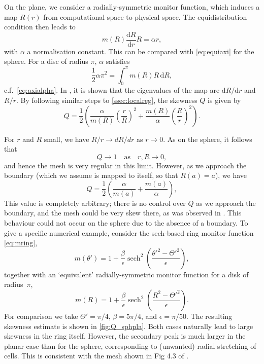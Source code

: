 \documentclass[11pt, a4paper]{scrartcl}  %
\theoremstyle{plain}
\theoremstyle{definition}
\numberwithin{equation}{section}
\DeclareMathOperator{\sech}{sech}
\newcommand{\dd}[2]{\frac{\mathrm{d} #1}{\mathrm{d} #2}}
\begin{document}
On the plane, we consider a radially-symmetric
monitor function, which induces a map $R(r)$ from computational space to
physical space. The equidistribution condition then leads to
\begin{equation}
\label{eq:equirad}
m(R) \dd{R}{r} R = \alpha r,
\end{equation}
with $\alpha$ a normalisation constant. This can be compared
with \cref{eq:equiaxi} for the sphere. For a disc of radius $\pi$,
$\alpha$ satisfies
\begin{equation}
\label{eq:radalpha}
\frac{1}{2} \alpha \pi^2 = \int_0^\pi m(R) R \,\mathrm{d}R,
\end{equation}
c.f.\ \cref{eq:axialpha}. In \citet{budd2015geometry}, it is shown that
the eigenvalues of the map are $\mathrm{d}R/\mathrm{d}r$ and $R/r$. By
following similar steps to \cref{ssec:localreg}, the skewness $Q$ is
given by
\begin{equation}
\label{eq:Qrad}
Q = \frac{1}{2} \left( \frac{\alpha}{m(R)} \left( \frac{r}{R} \right)^2 + \frac{m(R)}{\alpha} \left( \frac{R}{r} \right)^2 \right).
\end{equation}

For $r$ and $R$ small, we have $R/r \to dR/dr$ as $r \to 0$. As on the
sphere, it follows that
\begin{equation}
Q \to 1 \quad \mbox{as} \quad r, R \to 0,
\end{equation}
and hence the mesh is very regular in this limit. However, as we
approach the boundary (which we assume is mapped to itself, so that
$R(a) = a$), we have
\begin{equation}
Q = \frac{1}{2} \left( \frac{\alpha}{m(a)} + \frac{m(a)}{\alpha} \right),
\end{equation}
This value is completely arbitrary; there is no control over $Q$ as we
approach the boundary, and the mesh could be very skew there, as was
observed in \citet{budd2015geometry}. This behaviour could not occur on
the sphere due to the absence of a boundary.
To give a specific numerical example, consider the sech-based ring
monitor function \cref{eq:mring},
\begin{equation}
m(\theta') = 1 + \frac{\beta}{\epsilon} \sech^2\left(\frac{\theta'^2 - \Theta'^2}{\epsilon}\right),
\end{equation}
together with an `equivalent' radially-symmetric monitor function for a
disk of radius~$\pi$,
\begin{equation}
m(R) = 1 + \frac{\beta}{\epsilon} \sech^2\left(\frac{R^2 - \Theta'^2}{\epsilon}\right).
\end{equation}
For comparison we take $\Theta' = \pi/4$, $\beta = 5\pi/4$,
and $\epsilon = \pi/50$. The resulting skewness estimate is shown in
\cref{fig:Q_sphpla}. Both cases naturally lead to large skewness in the ring
itself. However, the secondary peak is much larger in the planar case
than for the sphere, corresponding to (unwanted) radial stretching of
cells. This is consistent with the mesh shown in Fig 4.3 of
\citet{budd2015geometry}.
\end{document}
